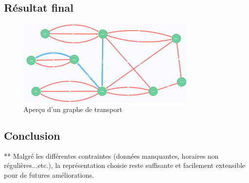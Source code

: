 \subsection{Résultat final}

\begin{figure}
	\center
	\includegraphics[width=0.8\textwidth]{img/GrapheNeo4j.png}
	\caption{Aperçu d'un graphe de transport}
\end{figure}

\subsection{Conclusion}

** Malgré les différentes contraintes (données manquantes, horaires non régulières...etc.), la représentation choisie reste suffisante et facilement extensible pour de futures améliorations.
\newpage
